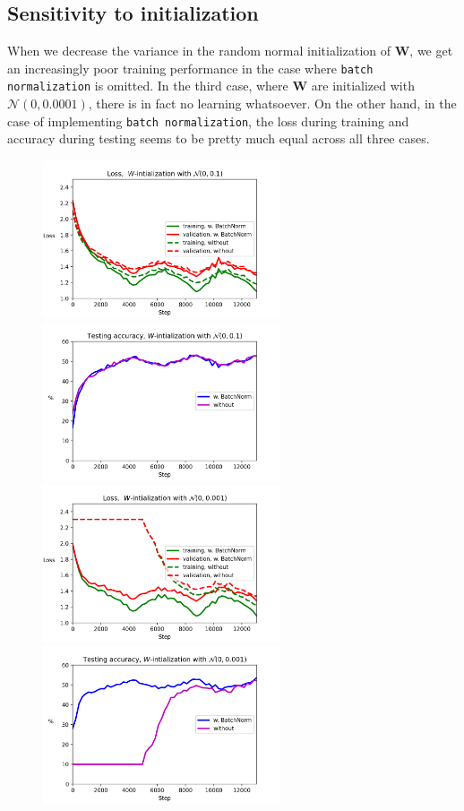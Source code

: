 \documentclass{article}
\begin{document}
\subsection*{Sensitivity to initialization}
	When we decrease the variance in the random normal initialization of $\bm{W}$, we get an increasingly poor training performance in the case where \texttt{batch normalization} is omitted. In the third case, where $\bm{W}$ are initialized with $\mathcal{N}(0, 0.0001)$, there is in fact no learning whatsoever. On the other hand, in the case of implementing \texttt{batch normalization}, the loss during training and accuracy during testing seems to be pretty much equal across all three cases.
	\begin{figure}[h!]
		\centering
		\includegraphics[width=7cm]{../plots/loss_comp_sigma1.png}
		\includegraphics[width=7cm]{../plots/acc_comp_sigma1.png}
		\includegraphics[width=7cm]{../plots/loss_comp_sigma2.png}
		\includegraphics[width=7cm]{../plots/acc_comp_sigma2.png}

\end{figure}
\end{document}
